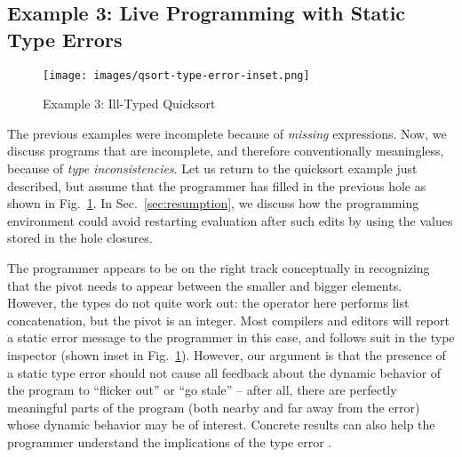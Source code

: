 

\subsection{Example 3: Live Programming with Static Type Errors}
\label{sec:static-errors}


\begin{figure}
\centering
\texttt{[image: images/qsort-type-error-inset.png]}
\vspace{2px}
\caption{Example 3: Ill-Typed Quicksort}
\label{fig:qsort-type-error}
\vspace{-3px}
\end{figure}


The previous examples were incomplete 
because of \emph{missing} expressions.
%
Now, we discuss programs that are incomplete, 
and therefore conventionally meaningless, because of
\emph{type inconsistencies}. 
%
Let us return to the quicksort example just described, 
but assume that the programmer has filled in the previous hole
as shown in Fig.~\ref{fig:qsort-type-error}. In Sec.~\ref{sec:resumption}, we discuss
how the programming environment could avoid restarting evaluation after such edits by using the values stored in the hole closures.

The programmer appears to be on the right track conceptually
in recognizing that the pivot needs to appear between the 
smaller and bigger elements. 
However, the types do not quite work out: the  operator here
performs list concatenation, but the pivot is an integer. 
Most compilers and editors will report a static error message
to the programmer in this case, and \Hazel 
follows suit in the type inspector (shown inset in Fig.~\ref{fig:qsort-type-error}). 
However, our argument is that the presence of a static type error should not cause all feedback about 
the dynamic behavior of the program to ``flicker out'' or ``go stale'' --
after all, there are perfectly meaningful parts of the program (both nearby
and far away from the error) 
whose dynamic behavior may be of interest. Concrete results can also help the programmer understand the implications of the type error \cite{Seidel2016}.


